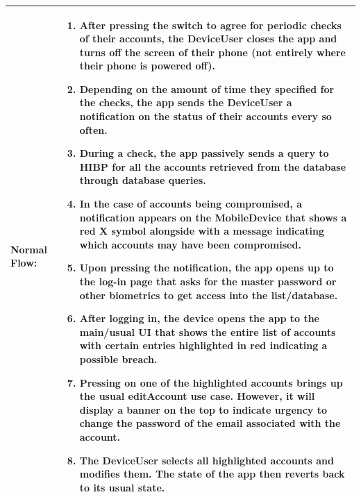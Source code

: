\documentclass[stu]{apa7}
\begin{document}
{{{\begin{xltabular}{\textwidth}{|l|X|}
  Normal Flow: &
                 \begin{enumerate}
                   \item After pressing the switch to agree for periodic checks of their accounts, the DeviceUser closes the app and turns off the screen of their phone (not entirely where their phone is powered off).
                   \item Depending on the amount of time they specified for the checks, the app sends the DeviceUser a notification on the status of their accounts every so often.
                   \item During a check, the app passively sends a query to HIBP for all the accounts retrieved from the database through database queries.
                   \item In the case of accounts being compromised, a notification appears on the MobileDevice that shows a red X symbol alongside with a message indicating which accounts may have been compromised.
                   \item Upon pressing the notification, the app opens up to the log-in page that asks for the master password or other biometrics to get access into the list/database.
                   \item After logging in, the device opens the app to the main/usual UI that shows the entire list of accounts  with certain entries highlighted in red indicating a possible breach.
                   \item Pressing on one of the highlighted accounts brings up the usual editAccount use case. However,  it will display a banner on the top to indicate urgency to change the password of the email associated with the account.
                   \item The DeviceUser selects all highlighted accounts and modifies them. The state of the app then reverts back to its usual state.
                \end{enumerate} \\ \hline


\end{xltabular}}}}
\end{document}
